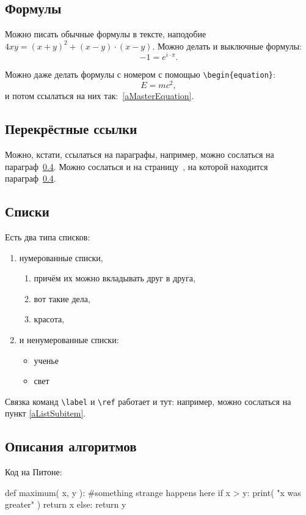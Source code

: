 \subsection{Формулы}
Можно писать обычные формулы в тексте, наподобие $4xy = (x+y)^2+(x-y)\cdot(x-y)$. Можно делать и выключные формулы: \[-1 = e^{i\cdot \pi}.\]

Можно даже делать формулы с номером с помощью \verb"\begin{equation}":
\begin{equation}
\label{aMasterEquation}
E=mc^2,
\end{equation}
и потом ссылаться на них так:~\eqref{aMasterEquation}.


\subsection{Перекрёстные ссылки}
Можно, кстати, ссылаться на параграфы, например, можно сослаться на параграф~\ref{Algo}. Можно сослаться и на страницу~\pageref{Algo}, на которой находится параграф~\ref{Algo}.

\newpage %

\subsection{Списки}
Есть два типа списков:
\begin{enumerate}
\item нумерованные списки,
    \begin{enumerate}
    \item причём их можно вкладывать друг в друга,
    \item вот такие дела,
    \item\label{aListSubitem} красота,
    \end{enumerate}
\item и ненумерованные списки:
    \begin{itemize}
    \item ученье
    \item свет
    \end{itemize}
\end{enumerate}

Связка команд \verb"\label" и \verb"\ref" работает и тут: например, можно сослаться на пункт \ref{aListSubitem}.


\subsection{Описания алгоритмов}\label{Algo}
Код на Питоне:
\begin{python}
def maximum( x, y ):
    #something strange happens here
    if x > y:
        print( "x was greater" )
        return x
    else:
        return y
\end{python}

